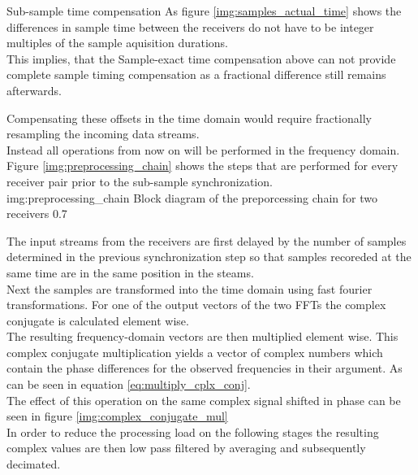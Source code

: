 \begin{subchapter}{Sub-sample time compensation}
  As figure \ref{img:samples_actual_time} shows the
  differences in sample time between the receivers do not
  have to be integer multiples of the sample aquisition durations. \\

  This implies, that the Sample-exact time compensation above
  can not provide complete sample timing compensation as
  a fractional difference still remains afterwards.

  Compensating these offsets in the time domain would
  require fractionally resampling the incoming data streams. \\

  Instead all operations from now on will be performed
  in the frequency domain. Figure \ref{img:preprocessing_chain}
  shows the steps that are performed for every receiver pair prior to
  the sub-sample synchronization. \\

               {img:preprocessing_chain}
               {Block diagram of the preporcessing chain for two receivers}
               {0.7}

  The input streams from the receivers are first delayed
  by the number of samples determined in the previous
  synchronization step so that samples recoreded at the
  same time are in the same position in the steams. \\

  Next the samples are transformed into the time domain
  using fast fourier transformations.
  For one of the output vectors of the two FFTs the
  complex conjugate is calculated element wise. \\

  The resulting frequency-domain vectors are then
  multiplied element wise. This complex conjugate multiplication
  yields a vector of complex numbers which contain the
  phase differences for the observed frequencies in
  their argument. As can be seen in equation
  \ref{eq:multiply_cplx_conj}. \\

  The effect of this operation on the same complex signal
  shifted in phase can be seen in figure \ref{img:complex_conjugate_mul} \\

  In order to reduce the processing load on the following stages
  the resulting complex values are then low pass filtered by
  averaging and subsequently decimated.


\end{subchapter}
